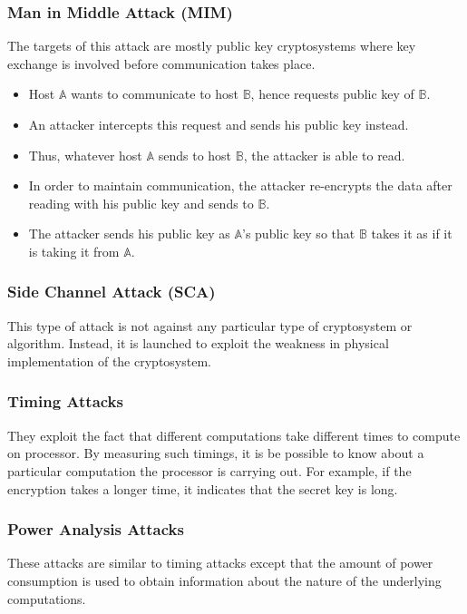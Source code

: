 \documentclass[british]{article}
\begin{document}
\subsubsection{Man in Middle Attack (MIM)}

The targets of this attack are mostly public key cryptosystems where
key exchange is involved before communication takes place. 
\begin{itemize}
\item Host $\mathbb{A}$ wants to communicate to host $\mathbb{B}$, hence
requests public key of $\mathbb{B}$.
\item An attacker intercepts this request and sends his public key instead.
\item Thus, whatever host $\mathbb{A}$ sends to host $\mathbb{B}$, the
attacker is able to read. 
\item In order to maintain communication, the attacker re-encrypts the data
after reading with his public key and sends to $\mathbb{B}$. 
\item The attacker sends his public key as $\mathbb{A}$'s public key so
that $\mathbb{B}$ takes it as if it is taking it from $\mathbb{A}$.
\end{itemize}

\subsubsection{Side Channel Attack (SCA)}

This type of attack is not against any particular type of cryptosystem
or algorithm. Instead, it is launched to exploit the weakness in physical
implementation of the cryptosystem.

\subsubsection{Timing Attacks}

They exploit the fact that different computations take different times
to compute on processor. By measuring such timings, it is be possible
to know about a particular computation the processor is carrying out.
For example, if the encryption takes a longer time, it indicates that
the secret key is long.

\subsubsection{Power Analysis Attacks}

These attacks are similar to timing attacks except that the amount
of power consumption is used to obtain information about the nature
of the underlying computations.
\end{document}
